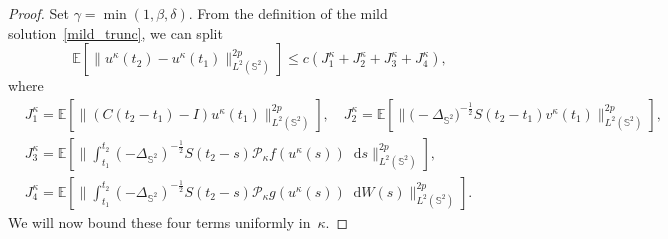 \documentclass[a4paper]{amsart}
\theoremstyle{remark}
\theoremstyle{definition}
\newcommand*\dd{\mathop{}\!\mathrm{d}}
\begin{document}
\begin{proof}
Set $\gamma=\min(1,\beta,\delta)$. From the definition of the mild solution~\eqref{mild_trunc}, we can split
$$
\mathbb{E}\left[\big\| u^\kappa(t_2)-u^\kappa(t_1)\big\|^{2p}_{L^2(\mathbb{S}^2)}\right]\le c\left(J_1^\kappa+J_2^\kappa+J_3^\kappa+J_4^\kappa\right),
$$
where 
$$
\begin{aligned}
&J_1^\kappa=\mathbb{E}\left[\big\| \left(C(t_2-t_1)-I\right)u^\kappa(t_1)\big\|^{2p}_{L^2(\mathbb{S}^2)}\right],\quad
J_2^\kappa=\mathbb{E}\left[\big\| \big(-\Delta_{\mathbb{S}^2}\big)^{-\frac{1}{2}}S(t_2-t_1)v^\kappa(t_1)\big\|^{2p}_{L^2(\mathbb{S}^2)}\right],\\
&J_3^\kappa=\mathbb{E}\left[\bigg\| \int_{t_1}^{t_2}(-\Delta_{\mathbb{S}^2})^{-\frac{1}{2}}S(t_2-s)\mathcal{P}_\kappa f(u^\kappa(s))\dd s\bigg\|^{2p}_{L^2(\mathbb{S}^2)}\right],\\
&J_4^\kappa=\mathbb{E}\left[\bigg\| \int_{t_1}^{t_2}(-\Delta_{\mathbb{S}^2})^{-\frac{1}{2}}S(t_2-s)\mathcal{P}_\kappa g(u^\kappa(s))\dd W(s) \bigg\|^{2p}_{L^2(\mathbb{S}^2)}\right].
\end{aligned}
$$
We will now bound these four terms uniformly in~$\kappa$. 


\end{proof}
\end{document}
